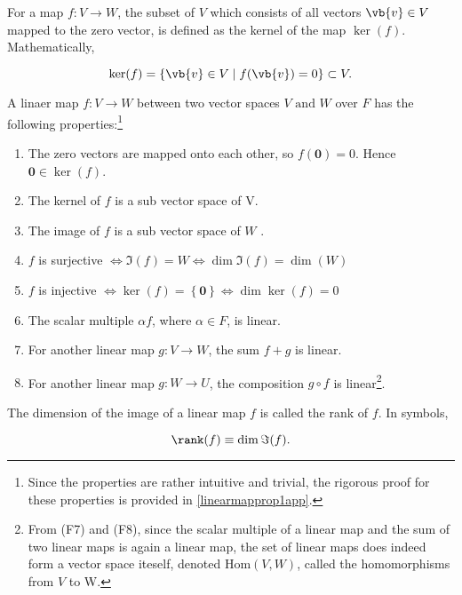 \documentclass[a4paper,12pt]{report}
\begin{document}
\begin{definition}
For a map \(f: V \rightarrow W\), the subset of \(V\) which consists of all vectors \(\vb{v} \in V\) mapped to the zero vector, is defined as the kernel of the map \(\ker (f)\). Mathematically,
    
\begin{equation}
    \ker (f) = \left\{ \vb{v} \in V \mid f(\vb{v} )=0 \right\} \subset V.
\end{equation}
    
\end{definition}

\begin{lemma} \label{linearmapprop1} 
A linaer map \(f:V \rightarrow W\) between two vector spaces \(V \text { and }  W\) over \(F\) has the following properties:\footnote{Since the properties are rather intuitive and trivial, the rigorous proof for these properties is provided in \cref{linearmapprop1app}.} 

\begin{enumerate}[label=(F\arabic*)]
    \item The zero vectors are mapped onto each other, so \(f(\boldsymbol{0} ) = 0\). Hence \(\boldsymbol{0} \in \ker (f) \).
    \item The kernel of \(f\) is a sub vector space of V.
    \item The image of \(f\) is a sub vector space of \(W\) .
    \item \(f\) is surjective \(\iff \Im (f) = W \iff \dim \Im (f) = \dim (W)\)
    \item \(f\) is injective \(\iff \ker (f) = \left\{ \boldsymbol{0}  \right\} \iff \dim \ker (f) = 0\)
    \item The scalar multiple \(\alpha f\), where \(\alpha \in  F\), is linear.
    \item For another linear map \(g: V \rightarrow W\), the sum \(f+g\) is linear.
    \item For another linear map \(g: W \rightarrow  U\), the composition \(g \circ f\) is linear\footnote{From (F7) and (F8), since the scalar multiple of a linear map and the sum of two linear maps is again a linear map, the set of linear maps does indeed form a vector space iteself, denoted \(\text{Hom}(V,W)\), called the homomorphisms from \(V\) to W.}.  
\end{enumerate}
\end{lemma}

\begin{definition} 
The dimension of the image of a linear map \(f\) is called the rank of \(f\). In symbols,

\begin{equation}
    \rank (f) \equiv \dim \Im (f).
\end{equation}
    
\end{definition}
\end{document}
